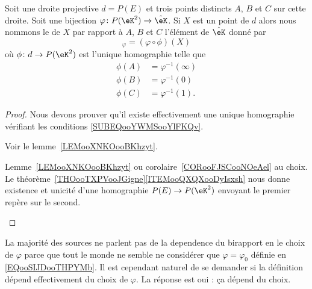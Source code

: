 \begin{propositionDef}      \label{DEFooBFSKooDwzwmO}
	Soit une droite projective \( d=P(E)\) et trois points distincts \( A\), \( B\) et \( C\) sur cette droite. Soit une bijection \( \varphi\colon P(\eK^2)\to \hat\eK\). Si \( X\) est un point de \( d\) alors nous nommons le  de \( X\) par rapport à \( A\), \( B\) et \( C\) l'élément de \( \hat\eK\) donné par
	\begin{equation}
		[A,B,C,X]_{\varphi}=(\varphi\circ\phi)(X)
	\end{equation}
	où \( \phi\colon d\to P(\eK^2) \) est l'unique homographie telle que
	\begin{subequations}        \label{SUBEQooYWMSooYlFKQv}
		\begin{align}
			\phi(A) & =\varphi^{-1}(\infty) \\
			\phi(B) & =\varphi^{-1}(0)      \\
			\phi(C) & =\varphi^{-1}(1).
		\end{align}
	\end{subequations}
\end{propositionDef}

\begin{proof}
	Nous devons prouver qu'il existe effectivement une unique homographie vérifiant les conditions \eqref{SUBEQooYWMSooYlFKQv}.
	\begin{subproof}
		Voir le lemme~\ref{LEMooXNKOooBKhzyt}.

		Lemme~\ref{LEMooXNKOooBKhzyt} ou corolaire~\ref{CORooFJSCooNOeAel} au choix.
		\spitem[Conclusion]
		Le théorème~\ref{THOooTXPVooJGigne}\ref{ITEMooQXQXooDyIsxsh} nous donne existence et unicité d'une homographie \( P(E)\to P(\eK^2) \) envoyant le premier repère sur le second.
	\end{subproof}
\end{proof}

\begin{remark}
	La majorité des sources ne parlent pas de la dependence du birapport en le choix de \( \varphi\) parce que tout le monde ne semble ne considérer que \( \varphi=\varphi_0\) définie en \eqref{EQooSIJDooTHPYMb}. Il est cependant naturel de se demander si la définition dépend effectivement du choix de \( \varphi\). La réponse est oui : ça dépend du choix.
\end{remark}

